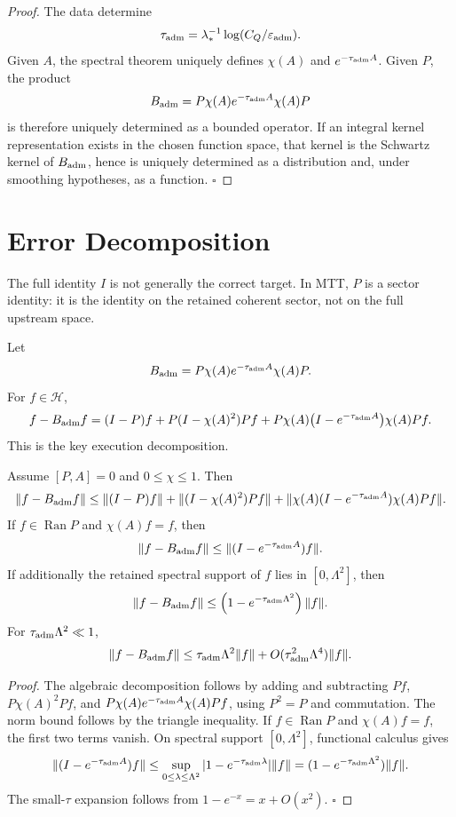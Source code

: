 \documentclass[11pt]{article}
\begin{document}
\begin{proof}
The data determine
\[
\tau_{\rm adm}=\lambda_\ast^{-1}\log(C_Q/\varepsilon_{\rm adm}).
\]
Given \(A\), the spectral theorem uniquely defines \(\chi(A)\) and \(e^{-\tau_{\rm adm}A}\). Given \(P\), the product
\[
B_{\rm adm}=P\chi(A)e^{-\tau_{\rm adm}A}\chi(A)P
\]
is therefore uniquely determined as a bounded operator. If an integral kernel representation exists in the chosen function space, that kernel is the Schwartz kernel of \(B_{\rm adm}\), hence is uniquely determined as a distribution and, under smoothing hypotheses, as a function. \(\square\)
\end{proof}

\section{Error Decomposition}

The full identity \(I\) is not generally the correct target. In MTT, \(P\) is a sector identity: it is the identity on the retained coherent sector, not on the full upstream space.

Let
\[
B_{\rm adm}=P\chi(A)e^{-\tau_{\rm adm}A}\chi(A)P.
\]
For \(f\in\mathcal H\),
\[
f-B_{\rm adm}f
=
(I-P)f
+
P(I-\chi(A)^2)Pf
+
P\chi(A)\big(I-e^{-\tau_{\rm adm}A}\big)\chi(A)Pf .
\]
This is the key execution decomposition.

\begin{theorem}
Assume \([P,A]=0\) and \(0\le\chi\le1\). Then
\[
\|f-B_{\rm adm}f\|
\le
\|(I-P)f\|
+
\|(I-\chi(A)^2)Pf\|
+
\|\chi(A)(I-e^{-\tau_{\rm adm}A})\chi(A)Pf\|.
\]
If \(f\in\operatorname{Ran}P\) and \(\chi(A)f=f\), then
\[
\|f-B_{\rm adm}f\|
\le
\|(I-e^{-\tau_{\rm adm}A})f\|.
\]
If additionally the retained spectral support of \(f\) lies in \([0,\Lambda^2]\), then
\[
\|f-B_{\rm adm}f\|
\le
\left(1-e^{-\tau_{\rm adm}\Lambda^2}\right)\|f\|.
\]
For \(\tau_{\rm adm}\Lambda^2\ll1\),
\[
\|f-B_{\rm adm}f\|
\le
\tau_{\rm adm}\Lambda^2\|f\|+O(\tau_{\rm adm}^2\Lambda^4)\|f\|.
\]
\end{theorem}

\begin{proof}
The algebraic decomposition follows by adding and subtracting \(Pf\), \(P\chi(A)^2Pf\), and \(P\chi(A)e^{-\tau_{\rm adm}A}\chi(A)Pf\), using \(P^2=P\) and commutation. The norm bound follows by the triangle inequality. If \(f\in\operatorname{Ran}P\) and \(\chi(A)f=f\), the first two terms vanish. On spectral support \([0,\Lambda^2]\), functional calculus gives
\[
\|(I-e^{-\tau_{\rm adm}A})f\|
\le
\sup_{0\le\lambda\le\Lambda^2}|1-e^{-\tau_{\rm adm}\lambda}|\|f\|
=
(1-e^{-\tau_{\rm adm}\Lambda^2})\|f\|.
\]
The small-\(\tau\) expansion follows from \(1-e^{-x}=x+O(x^2)\). \(\square\)
\end{proof}
\end{document}
